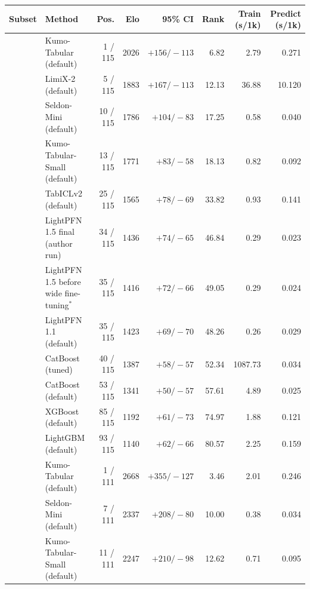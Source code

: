 \begin{tabular}{llrrrrrr}
\toprule
Subset & Method & Pos. & Elo & 95\% CI & Rank & Train (s/1k) & Predict (s/1k) \\
\midrule
{}
 & Kumo-Tabular (default) & 1 / 115 & 2026 & $+156/-113$ & 6.82 & 2.79 & 0.271 \\
 & LimiX-2 (default) & 5 / 115 & 1883 & $+167/-113$ & 12.13 & 36.88 & 10.120 \\
 & Seldon-Mini (default) & 10 / 115 & 1786 & $+104/-83$ & 17.25 & 0.58 & 0.040 \\
 & Kumo-Tabular-Small (default) & 13 / 115 & 1771 & $+83/-58$ & 18.13 & 0.82 & 0.092 \\
 & TabICLv2 (default) & 25 / 115 & 1565 & $+78/-69$ & 33.82 & 0.93 & 0.141 \\
 & LightPFN 1.5 final (author run) & 34 / 115 & 1436 & $+74/-65$ & 46.84 & 0.29 & 0.023 \\
 & LightPFN 1.5 before wide fine-tuning$^{\ast}$ & 35 / 115 & 1416 & $+72/-66$ & 49.05 & 0.29 & 0.024 \\
 & LightPFN 1.1 (default) & 35 / 115 & 1423 & $+69/-70$ & 48.26 & 0.26 & 0.029 \\
 & CatBoost (tuned) & 40 / 115 & 1387 & $+58/-57$ & 52.34 & 1087.73 & 0.034 \\
 & CatBoost (default) & 53 / 115 & 1341 & $+50/-57$ & 57.61 & 4.89 & 0.025 \\
 & XGBoost (default) & 85 / 115 & 1192 & $+61/-73$ & 74.97 & 1.88 & 0.121 \\
 & LightGBM (default) & 93 / 115 & 1140 & $+62/-66$ & 80.57 & 2.25 & 0.159 \\
\midrule
{}
 & Kumo-Tabular (default) & 1 / 111 & 2668 & $+355/-127$ & 3.46 & 2.01 & 0.246 \\
 & Seldon-Mini (default) & 7 / 111 & 2337 & $+208/-80$ & 10.00 & 0.38 & 0.034 \\
 & Kumo-Tabular-Small (default) & 11 / 111 & 2247 & $+210/-98$ & 12.62 & 0.71 & 0.095 \\

\end{tabular}
